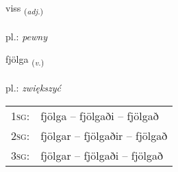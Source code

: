 \documentclass[frontgrid, backgrid]{flacards}\usepackage[]{graphicx}\usepackage[]{xcolor}
\begin{document}
\renewcommand{\flhead}{\vskip5pt \fboxsep=0pt {\small\bfseries\footnotesize Lýsingarorð | przymiotnik}}
\renewcommand{\fcfoot}{\vskip5pt \fboxsep=0pt \hspace{2pt}{\small\bfseries\footnotesize 1K}}

\renewcommand{\blhead}{\vskip5pt {\small\bfseries\footnotesize Lýsingarorð | przymiotnik }}
\renewcommand{\bcfoot}{\vskip5pt \hspace{2pt}{\small\bfseries\footnotesize 1K}}


{viss \small{\textsubscript{(\textit{adj.})}} \\[1ex] %
\textphonetic{[vɪs]} \\
pl.: \emph{pewny} \\  [2ex]
\renewcommand*{\arraystretch}{0.8}
}

\renewcommand{\flhead}{\vskip5pt \fboxsep=0pt {\small\bfseries\footnotesize Sagnorð | czasownik}}
\renewcommand{\fcfoot}{\vskip5pt \fboxsep=0pt \hspace{2pt}{\small\bfseries\footnotesize 1K}}

\renewcommand{\blhead}{\vskip5pt {\small\bfseries\footnotesize Sagnorð | czasownik }}
\renewcommand{\bcfoot}{\vskip5pt \hspace{2pt}{\small\bfseries\footnotesize 1K}}


{fjölga \small{\textsubscript{(\textit{v.})}} \\[1ex] %
\textphonetic{[fjœlka]} \\
pl.: \emph{zwiększyć} \\  [2ex]
\renewcommand*{\arraystretch}{0.8}
\begin{tabular}{p{1cm}l}
\textsc{1sg}: & fjölga -- fjölgaði -- fjölgað \\ 
\textsc{2sg}: & fjölgar -- fjölgaðir -- fjölgað \\ 
\textsc{3sg}: & fjölgar -- fjölgaði -- fjölgað \\ 
\end{tabular}
}
\end{document}
